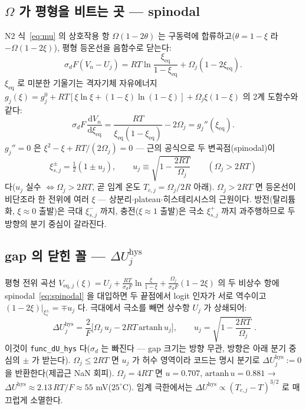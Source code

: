 \documentclass[11pt,a4paper]{article}
\newcommand{\dd}{\mathrm{d}}
\newcommand{\eq}{\mathrm{eq}}
\newcommand{\hys}{\mathrm{hys}}
\newcommand{\code}[1]{\texttt{#1}}
\begin{document}
\subsection{$\Omega$ 가 평형을 비트는 곳 — spinodal}
N2 식~\eqref{eq:mu} 의 상호작용 항 $\Omega(1-2\theta)$ 는 구동력에 합류하고($\theta=1-\xi$ 라 $-\Omega(1-2\xi)$), 평형 등온선을 음함수로 닫는다:
\begin{equation}
\sigma_dF(V_n-U_j)=RT\ln\frac{\xi_\eq}{1-\xi_\eq}+\Omega_j(1-2\xi_\eq).
\label{eq:isotherm}
\end{equation}
$\xi_\eq$ 로 미분한 기울기는 격자기체 자유에너지 $g_j(\xi)=g_j^0+RT[\xi\ln\xi+(1-\xi)\ln(1-\xi)]+\Omega_j\xi(1-\xi)$ 의 2계 도함수와 같다:
\begin{equation}
\sigma_dF\,\frac{\dd V_n}{\dd\xi_\eq}=\frac{RT}{\xi_\eq(1-\xi_\eq)}-2\Omega_j=g_j''(\xi_\eq).
\label{eq:gpp}
\end{equation}
$g_j''=0$ 은 $\xi^2-\xi+RT/(2\Omega_j)=0$ — 근의 공식으로 두 변곡점(spinodal)이
\begin{equation}
\xi_{s,j}^\pm=\tfrac12(1\pm u_j),\qquad u_j\equiv\sqrt{1-\frac{2RT}{\Omega_j}}\qquad(\Omega_j>2RT)
\label{eq:spinodal}
\end{equation}
다($u_j$ 실수 $\Leftrightarrow\Omega_j>2RT$, 곧 임계 온도 $T_{c,j}=\Omega_j/2R$ 아래). $\Omega_j>2RT$ 면 등온선이 비단조라 한 전위에 여러 $\xi$ — 상분리$\cdot$plateau$\cdot$히스테리시스의 근원이다. 방전(탈리튬화, $\xi\!\approx\!0$ 출발)은 극대 $\xi_{s,j}^-$ 까지, 충전($\xi\!\approx\!1$ 출발)은 극소 $\xi_{s,j}^+$ 까지 과주행하므로 두 방향의 분기 중심이 갈라진다.

\subsection{gap 의 닫힌 꼴 — $\Delta U_j^\hys$}
평형 전위 곡선 $V_{\eq,j}(\xi)=U_j+\tfrac{RT}{\sigma_dF}\ln\tfrac{\xi}{1-\xi}+\tfrac{\Omega_j}{\sigma_dF}(1-2\xi)$ 의 두 비상수 항에 spinodal~\eqref{eq:spinodal} 을 대입하면 두 끝점에서 logit 인자가 서로 역수이고 $(1-2\xi)|_{\xi_{s}^\pm}=\mp u_j$ 다. 극대에서 극소를 빼면 상수항 $U_j$ 가 상쇄되어:
\begin{equation}
\boxed{\;\Delta U_j^\hys
=\frac{2}{F}\Big[\Omega_j\,u_j-2RT\,\mathrm{artanh}\,u_j\Big],\qquad
u_j=\sqrt{1-\frac{2RT}{\Omega_j}}\;.}
\label{eq:hysdU}
\end{equation}
이것이 \code{func\_dU\_hys} 다($\sigma_d$ 는 빠진다 — gap 크기는 방향 무관, 방향은 아래 분기 중심의 $\pm$ 가 받는다). $\Omega_j\le2RT$ 면 $u_j$ 가 허수 영역이라 코드는 명시 분기로 $\Delta U_j^\hys:=0$ 을 반환한다(제곱근 NaN 회피). $\Omega_j=4RT$ 면 $u=0.707$, $\mathrm{artanh}\,u=0.881$ → $\Delta U^\hys\approx2.13\,RT/F\approx55$ mV($25^\circ$C). 임계 극한에서는 $\Delta U^\hys\propto(T_{c,j}-T)^{3/2}$ 로 매끄럽게 소멸한다.
\end{document}
